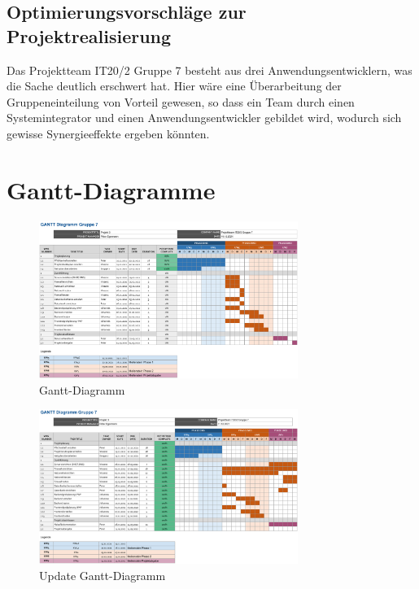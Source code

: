 \documentclass[a4paper,
    11pt,
    headings=small,
    ngerman,
    listof=totoc,
    numbers=noenddot]{scrreprt}[2021/11/13]
\begin{document}
\section{Optimierungsvorschläge zur Projektrealisierung}

Das Projektteam IT20/2 Gruppe 7 besteht aus drei Anwendungsentwicklern, was die Sache deutlich erschwert hat. Hier wäre eine Überarbeitung der Gruppeneinteilung von Vorteil gewesen, so dass ein Team durch einen Systemintegrator und einen Anwendungsentwickler gebildet wird, wodurch sich gewisse Synergieeffekte ergeben könnten.


\newpage

\listoffigures
\listoftables
\lstlistoflistings
\printbibliography[keyword=Quelle,title={Literaturverzeichnis},heading=bibintoc]

\newpage

\appendix
{}



\chapter{Gantt-Diagramme}

\begin{figure}[h!]
  \centering
  \includegraphics[angle=90,origin=c,width=0.75\textwidth]{data/Gantt.png}
  \caption{Gantt-Diagramm}
  \label{fig:Gantt}
\end{figure}

\newpage

\begin{figure}[h!]
  \centering
  \includegraphics[angle=90,origin=c,width=0.75\textwidth]{data/Gantt_Abschluss.png}
  \caption{Update Gantt-Diagramm}
  \label{fig:GanttUpdate}
\end{figure}
\end{document}

